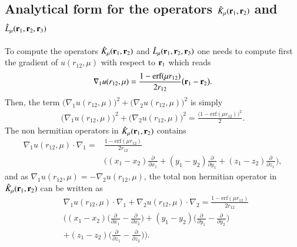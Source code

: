 \documentclass[aip,jcp,reprint,noshowkeys,superscriptaddress]{revtex4-1}
\newcommand{\deriv}[3]{\frac{\partial^{#3} #1}{\partial {#2}^{#3}}}
\newcommand{\br}[0]{{\bf {r}}}
\newcommand{\bri}[1]{{\bf r}_{#1}}
\begin{document}
\subsection{Analytical form for the operators $\hat{K}_\mu(\bri{1},\bri{2}) $ and $\hat{L}_\mu(\bri{1},\bri{2},\bri{3})$ }
\label{k_l_appendix}
To compute the operators $\hat{K}_\mu(\bri{1},\bri{2})$ and $\hat{L}_\mu(\bri{1},\bri{2},\bri{3}) $ one needs to compute first the gradient of $u(r_{12},\mu)$ with respect to $\bri{1}$ which reads 
\begin{equation}
 \label{eq:nabla_u}
 \begin{aligned}
 \nabla_1 u(r_{12},\mu) = \frac{1 - \text{erf}(\mu r_{12})}{2 r_{12}} \big( \br{}_1 - \br{}_2 \big).
 \end{aligned}
\end{equation}
Then, the term $\big(\nabla_1 u(r_{12},\mu) \big) ^2 + \big(\nabla_2 u(r_{12},\mu) \big) ^2$ is simply 
\begin{equation}
 \begin{aligned}
 \big(\nabla_1 u(r_{12},\mu) \big) ^2 + \big(\nabla_2 u(r_{12},\mu) \big) ^2 = \frac{\bigg(1 - \text{erf}(\mu r_{12}) \bigg)^2}{2}.
 \end{aligned}
\end{equation}
The non hermitian operators in $\hat{K}_\mu(\bri{1},\bri{2})$ contains 
\begin{equation}
 \begin{aligned}
 \nabla_1 u(r_{12},\mu) \cdot \nabla_1  = &\frac{1 - \text{erf}(\mu r_{12})}{2 r_{12}} \\ 
                                          &\bigg( (x_1 - x_2) \deriv{}{x_1}{} + (y_1 - y_2) \deriv{}{y_1}{} + (z_1 - z_2) \deriv{}{z_1}{}\bigg),
 \end{aligned}
\end{equation}
and as $\nabla_1 u(r_{12},\mu) = - \nabla_2 u(r_{12},\mu)$,   
the total non hermitian operator in $\hat{K}_\mu(\bri{1},\bri{2})$ can be written as 
\begin{equation}
 \begin{aligned}
 \label{def_non_hermit}
& \nabla_1 u(r_{12},\mu) \cdot \nabla_1 + \nabla_2 u(r_{12},\mu) \cdot \nabla_2 = \frac{1 - \text{erf}(\mu r_{12})}{2 r_{12}} \\
& \bigg( (x_1 - x_2) \big( \deriv{}{x_1}{} - \deriv{}{x_2}{} \big) +
         (y_1 - y_2) \big( \deriv{}{y_1}{} - \deriv{}{y_2}{} \big)  \\
&  +      (z_1 - z_2) \big( \deriv{}{z_1}{} - \deriv{}{z_2}{} \big)\bigg).
 \end{aligned}
\end{equation}
\end{document}
